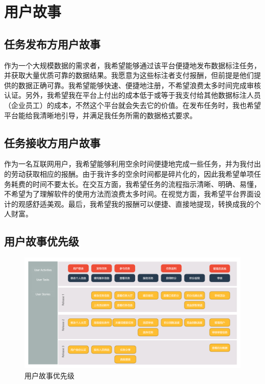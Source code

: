 \section{用户故事}

\subsection{任务发布方用户故事}

作为一个大规模数据的需求者，我希望能够通过该平台便捷地发布数据标注任务，并获取大量优质可靠的数据结果。我愿意为这些标注者支付报酬，但前提是他们提供的数据正确可靠。我希望能够快速、便捷地注册，不希望浪费太多时间完成审核认证。另外，我希望我在平台上付出的成本低于或等于我支付给其他数据标注人员（企业员工）的成本，不然这个平台就会失去它的价值。在发布任务时，我也希望平台能给我清晰地引导，并满足我任务所需的数据格式要求。

\subsection{任务接收方用户故事}

作为一名互联网用户，我希望能够利用空余时间便捷地完成一些任务，并为我付出的劳动获取相应的报酬。由于我许多的空余时间都是碎片化的，因此我希望单项任务耗费的时间不要太长。在交互方面，我希望任务的流程指示清晰、明确、易懂，不希望为了理解软件的使用方法而浪费太多时间。在视觉方面，我希望平台界面设计的观感舒适美观。最后，我希望我的报酬可以便捷、直接地提现，转换成我的个人财富。

\subsection{用户故事优先级}

\begin{figure}[h!]
    \centering
    \includegraphics[width=\linewidth]{imgs/roadmap.png}
    \caption{用户故事优先级}
\end{figure}